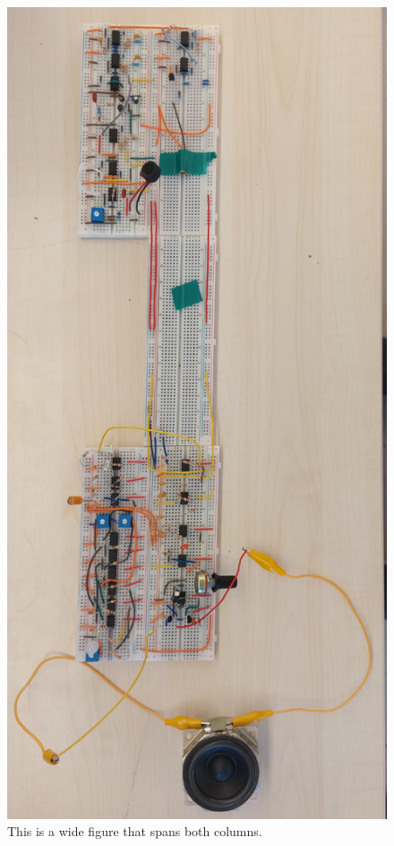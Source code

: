 \documentclass[conference]{IEEEtran}
\begin{document}
\begin{figure}[H] 
    \centering
    \includegraphics[scale=0.3]{all.png}
    \caption{This is a wide figure that spans both columns.}
    \label{fig:img1}
\end{figure}
\end{document}
